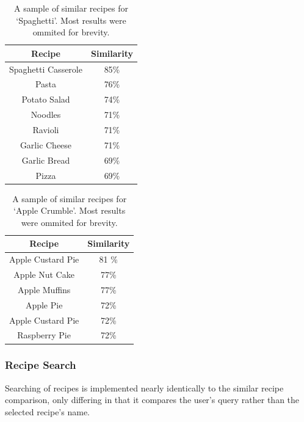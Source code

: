 \begin{table}
    \centering
    \caption{
        \label{tab:similar_spaghetti}A sample of similar recipes for \enquote*{Spaghetti}.
        Most results were ommited for brevity.}
    \begin{tabular}{cc}\toprule
        \textbf{Recipe} & \textbf{Similarity} \\\midrule
        Spaghetti Casserole & 85\% \\
        Pasta & 76\% \\
        Potato Salad & 74\% \\
        Noodles & 71\% \\
        Ravioli & 71\% \\
        Garlic Cheese & 71\% \\
        Garlic Bread & 69\% \\
        Pizza & 69\% \\
        \bottomrule
    \end{tabular}
\end{table}

\begin{table}
    \centering
    \caption{\label{tab:similar_apple_crumble}A sample of similar recipes for \enquote*{Apple Crumble}.
    Most results were ommited for brevity.}
    \begin{tabular}{cc}\toprule
        \textbf{Recipe} & \textbf{Similarity} \\\midrule
        Apple Custard Pie & 81 \% \\
        Apple Nut Cake & 77\% \\
        Apple Muffins & 77\% \\
        Apple Pie & 72\% \\
        Apple Custard Pie & 72\% \\
        Raspberry Pie & 72\% \\
        \bottomrule
    \end{tabular}
\end{table}

\subsubsection{Recipe Search}

Searching of recipes is implemented nearly identically to the similar recipe comparison, only differing in that
it compares the user's query rather than the selected recipe's name.


